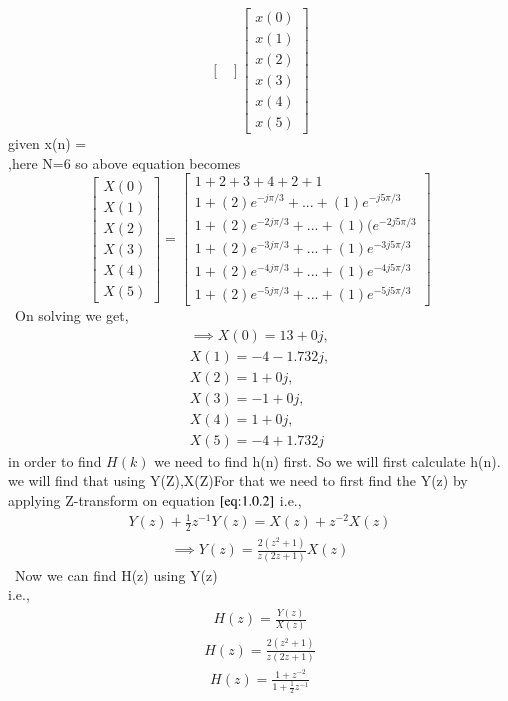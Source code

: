 \documentclass[journal,12pt,twocolumn]{IEEEtran}
\renewcommand\thesection{\arabic{section}}
\begin{document}
\begin{enumerate}[label=\thesection.\arabic*.,ref=\thesection.\theenumi]
\begin{equation}
\begin{bmatrix}
\end{bmatrix}%
\begin{bmatrix}
x(0) \\ x(1) \\ x(2) \\ x(3) \\ x(4) \\x(5)
\end{bmatrix}
\end{equation}
given x(n) =  \\,here N=6 so above equation becomes
\begin{equation}
\begin{bmatrix} X(0) \\ X(1) \\ X(2) \\ X(3) \\ X(4) \\ X(5) \end{bmatrix}
=
\begin{bmatrix}
1 +2+3+4+2+1 \\ 1+ (2)e^{-j\pi /3} + ... + (1)e^{-j5\pi /3}\\ 1 + (2)e^{-2j\pi /3} + ... +(1)(e^{-2j5\pi /3}\\ 1 + (2)e^{-3j\pi /3} + ... + (1)e^{-3j5\pi /3}\\ 1 + (2)e^{-4j\pi /3} + ... + (1)e^{-4j5\pi /3}\\ 1 + (2)e^{-5j\pi /3} + ... + (1)e^{-5j5\pi /3}
\end{bmatrix}
\end{equation}
\
On solving we get,
\begin{align}
    \implies X(0) = 13 + 0j,\\
    X(1) = -4 - 1.732j,\\
    X(2) = 1 + 0j,
    \\
    X(3) = -1 + 0j,\\
    X(4) = 1 + 0j,\\
    X(5) = -4 + 1.732j
\end{align}
in order to find $H(k)$ we need to find h(n) first. So we will first calculate h(n). we will find that using Y(Z),X(Z)For that we need to first find the Y(z) by applying Z-transform on equation $\eqref{eq:1.0.2}$ i.e.,
\begin{align}
    Y(z) + \frac{1}{2}z^{-1}Y(z)=X(z) + z^{-2}X(z)
\end{align}
\begin{align}
    \implies Y(z)=\frac{2(z^2+1)}{z(2z+1)}X(z)
\end{align}
\
Now we can find H(z) using Y(z)\\
 i.e.,
\begin{align}
    H(z) = \frac{Y(z)}{X(z)}
\end{align}
\begin{align}
 H(z) = \frac{2(z^2+1)}{z(2z+1)}
\end{align}
\begin{align}
 H(z) = \frac{1+z^{-2}}{1+\frac{1}{2}z^{-1}}
\end{align}


\end{enumerate}
\end{document}

